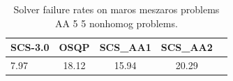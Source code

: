 \begin{table}
\centering
\caption{Solver failure rates on maros meszaros problems AA 5 5 nonhomog problems.}
\label{t-maros meszaros problems AA 5 5 nonhomog-failure}
\begin{tabular}{lcccc}
\toprule
 SCS-3.0 &  OSQP &  SCS\_AA1 &  SCS\_AA2 \\
\midrule
    7.97 & 18.12 &    15.94 &    20.29 \\
\bottomrule
\end{tabular}
\end{table}
